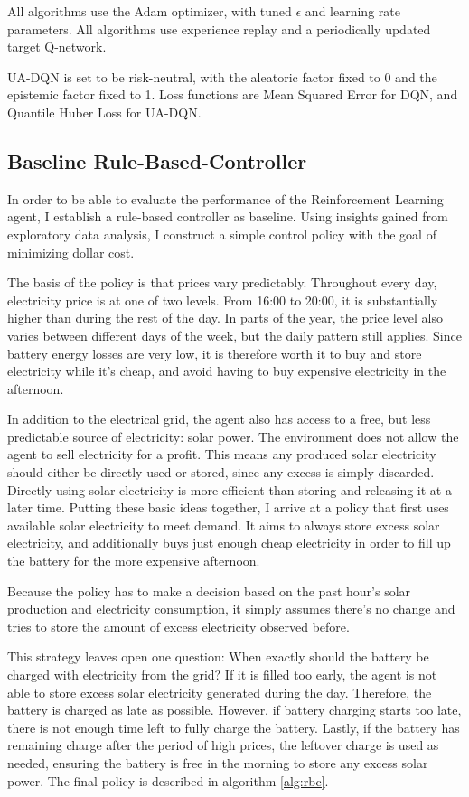 All algorithms use the Adam optimizer, with tuned $\epsilon$ and learning rate parameters.
All algorithms use experience replay and a periodically updated target Q-network.

UA-DQN is set to be risk-neutral, with the aleatoric factor fixed to 0 and the epistemic factor fixed to 1.
Loss functions are Mean Squared Error for DQN, and Quantile Huber Loss for UA-DQN.

\subsection{Baseline Rule-Based-Controller}
In order to be able to evaluate the performance of the Reinforcement Learning agent, I establish a rule-based controller as baseline.
Using insights gained from exploratory data analysis, I construct a simple control policy with the goal of minimizing dollar cost.

The basis of the policy is that prices vary predictably.
Throughout every day, electricity price is at one of two levels.
From 16:00 to 20:00, it is substantially higher than during the rest of the day.
In parts of the year, the price level also varies between different days of the week, but the daily pattern still applies.
Since battery energy losses are very low, it is therefore worth it to buy and store electricity while it's cheap, and avoid having to buy expensive electricity in the afternoon.

In addition to the electrical grid, the agent also has access to a free, but less predictable source of electricity: solar power.
The environment does not allow the agent to sell electricity for a profit.
This means any produced solar electricity should either be directly used or stored, since any excess is simply discarded.
Directly using solar electricity is more efficient than storing and releasing it at a later time.
Putting these basic ideas together, I arrive at a policy that first uses available solar electricity to meet demand.
It aims to always store excess solar electricity, and additionally buys just enough cheap electricity in order to fill up the battery for the more expensive afternoon.

Because the policy has to make a decision based on the past hour's solar production and electricity consumption, it simply assumes there's no change and tries to store the amount of excess electricity observed before.

This strategy leaves open one question:
When exactly should the battery be charged with electricity from the grid?
If it is filled too early, the agent is not able to store excess solar electricity generated during the day.
Therefore, the battery is charged as late as possible.
However, if battery charging starts too late, there is not enough time left to fully charge the battery. 
Lastly, if the battery has remaining charge after the period of high prices, the leftover charge is used as needed, ensuring the battery is free in the morning to store any excess solar power.
The final policy is described in algorithm \ref{alg:rbc}.

